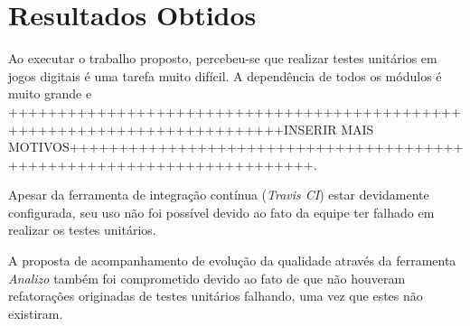 \chapter[Resultados Obtidos]{Resultados Obtidos}

Ao executar o trabalho proposto, percebeu-se que realizar testes unitários em jogos digitais é uma tarefa muito difícil. A dependência de todos os módulos é muito grande e ++++++++++++++++++++++++++++++++++++++++++++++++++++++++++++++++++++++++++INSERIR MAIS MOTIVOS+++++++++++++++++++++++++++++++++++++++++++++++++++++++++++++++++++++++. 

Apesar da ferramenta de integração contínua (\textit{Travis CI}) estar devidamente configurada, seu uso não foi possível devido ao fato da equipe ter falhado em realizar os testes unitários. 

A proposta de acompanhamento de evolução da qualidade através da ferramenta \textit{Analizo} também foi comprometido devido ao fato de que não houveram refatorações originadas de testes unitários falhando, uma vez que estes não existiram.

